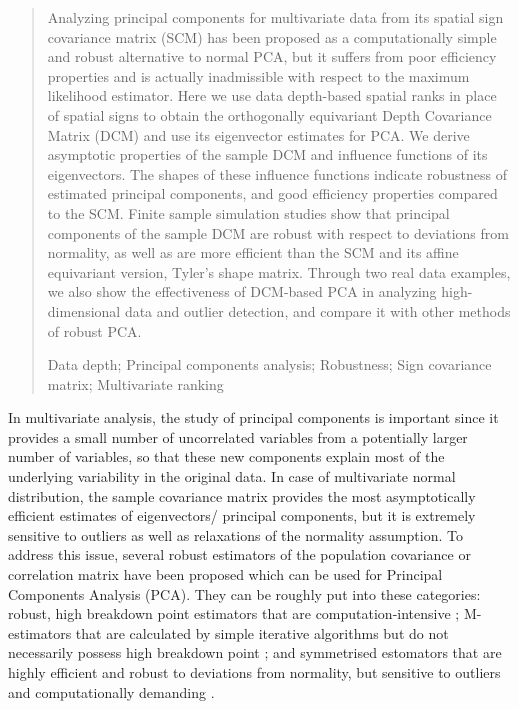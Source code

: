\documentclass[10pt]{book}
\begin{document}
\begin{quotation}
Analyzing principal components for multivariate data from its spatial sign covariance matrix (SCM) has been proposed as a computationally simple and robust alternative to normal PCA, but it suffers from poor efficiency properties and is actually inadmissible with respect to the maximum likelihood estimator. Here we use data depth-based spatial ranks in place of spatial signs to obtain the orthogonally equivariant Depth Covariance Matrix (DCM) and use its eigenvector estimates for PCA. We derive asymptotic properties of the sample DCM and influence functions of its eigenvectors. The shapes of these influence functions indicate robustness of estimated principal components, and good efficiency properties compared to the SCM. Finite sample simulation studies show that principal components of the sample DCM are robust with respect to deviations from normality, as well as are more efficient than the SCM and its affine equivariant version, Tyler's shape matrix. Through two real data examples, we also show the effectiveness of DCM-based PCA in analyzing high-dimensional data and outlier detection, and compare it with other methods of robust PCA.
\par

\vspace{9pt}
Data depth; Principal components analysis; Robustness; Sign covariance matrix; Multivariate ranking
\par
\end{quotation}\par

\def\thefigure{\arabic{figure}}
\def\thetable{\arabic{table}}

\fontsize{10.95}{14pt plus.8pt minus .6pt}\selectfont

\setcounter{chapter}{1}
\setcounter{equation}{0} %

In multivariate analysis, the study of principal components is important since it provides a small number of uncorrelated variables from a potentially larger number of variables, so that these new components explain most of the underlying variability in the original data. In case of multivariate normal distribution, the sample covariance matrix provides the most asymptotically efficient estimates of eigenvectors/ principal components, but it is extremely sensitive to outliers as well as relaxations of the normality assumption. To address this issue, several robust estimators of the population covariance or correlation matrix have been proposed which can be used for Principal Components Analysis (PCA). They can be roughly put into these categories: robust, high breakdown point estimators that are computation-intensive \citep{rousseeuw85, maronna76}; M-estimators that are calculated by simple iterative algorithms but do not necessarily possess high breakdown point \citep{huber77, tyler87}; and symmetrised estomators that are highly efficient and robust to deviations from normality, but sensitive to outliers and computationally demanding \citep{dumbgen98, sirkia07}.
\end{document}
